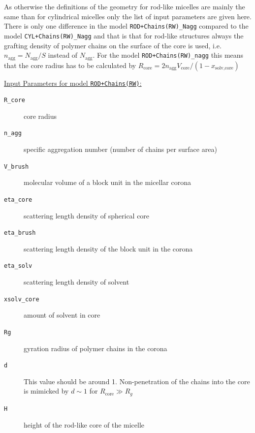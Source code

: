 \vspace{1cm}

\noindent
As otherwise the definitions of the geometry for rod-like micelles are mainly the same
than for cylindrical micelles only the list of input parameters are given here. There is
only one difference in the model \texttt{ROD+Chains(RW)\_Nagg} compared to the
model \texttt{CYL+Chains(RW)\_Nagg} and that is that for rod-like structures always the
grafting density of polymer chains on the surface of the core is used, i.e.
$n_\text{agg}=N_\text{agg}/S$ instead of $N_\text{agg}$. For the model \texttt{ROD+Chains(RW)\_nagg}
this means that the core radius has to be calculated by
$R_\text{core} = 2 n_\text{agg} V_\text{core} / (1-x_\text{solv,core})$

\vspace{3mm}

\uline{Input Parameters for model \texttt{ROD+Chains(RW)}:}\\
\begin{description}
\item[\texttt{R\_core}] core radius
\item[\texttt{n\_agg}] specific aggregation number (number of chains per surface area)
\item[\texttt{V\_brush}]  molecular volume of a block unit in the micellar corona
\item[\texttt{eta\_core}] scattering length density of spherical core
\item[\texttt{eta\_brush}] scattering length density of the block unit in the corona
\item[\texttt{eta\_solv}] scattering length density of solvent
\item[\texttt{xsolv\_core}] amount of solvent in core
\item[\texttt{Rg}] gyration radius of polymer chains in the corona
\item[\texttt{d}] This value should be around 1. Non-penetration of the chains
into the core is mimicked by $d\sim 1$ for $R_\text{core}\gg R_g$
\item[\texttt{H}] height of the rod-like core of the micelle
\end{description}


\vspace{10mm}

